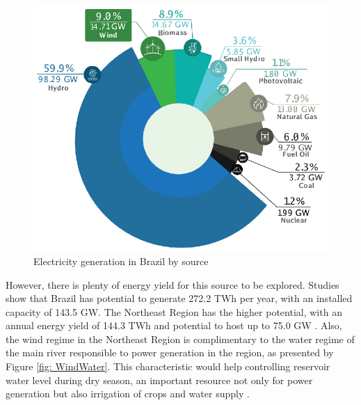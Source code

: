 \begin{figure}[b]
	\caption{Electricity generation in Brazil by source}
	\begin{center}
		\includegraphics[scale=0.75]{Images/BRshare19.eps}
	\end{center}
	\label{fig: BRshare}
\end{figure}

However, there is plenty of energy yield for this source to be explored. Studies show that Brazil has potential to generate 272.2 TWh per year, with an installed capacity of 143.5 GW. The Northeast Region has the higher potential, with an annual energy yield of 144.3 TWh and potential to host up to 75.0 GW \cite{Atlas2001}. Also, the wind regime in the Northeast Region is complimentary to the water regime of the main river responsible to power generation in the region, as presented by Figure \ref{fig: WindWater}. This characteristic would help controlling reservoir water level during dry season, an important resource not only for power generation but also irrigation of crops and water supply \cite{ANEEL2005}.

